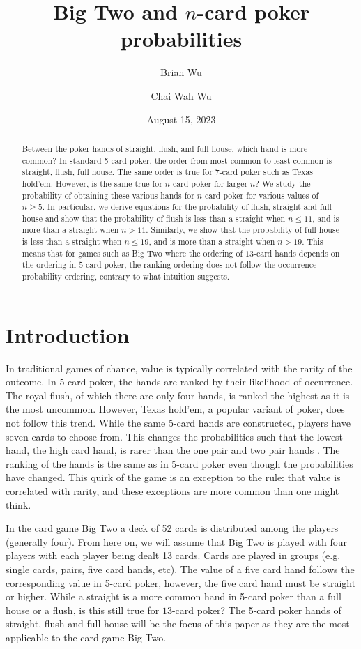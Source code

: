 \documentclass{article}
\title{Big Two and $n$-card poker probabilities}
\author[1]{Brian Wu}
\author[2]{Chai Wah Wu}
\affil[1]{New York University\thanks{briantehwu@gmail.com}}
\affil[2]{MIT-IBM Watson AI Lab, IBM T. J. Watson Research Center\thanks{cwwu@us.ibm.com}}
\date{August 15, 2023}
\begin{document}
\lstset{language=Python}

\maketitle

\begin{abstract}
    Between the poker hands of straight, flush, and full house, which hand is more common? In standard 5-card poker, the order from most common to least common is straight, flush, full house. The same order is true for 7-card poker such as Texas hold'em. However, is the same true for $n$-card poker for larger $n$? We study the probability of obtaining these various hands for $n$-card poker for various values of $n\geq 5$. In particular, we derive equations for the probability of flush, straight and full house and show that the probability of flush is less than a straight when $n \leq 11$, and is more than a straight when $n>11$.
    Similarly, we show that the probability of full house is less than a straight when $n \leq 19$, and is more than a straight when $n>19$.
    This means that for games such as Big Two where the ordering of $13$-card hands depends on the ordering in $5$-card poker, the ranking ordering does not follow the occurrence probability ordering, contrary to what intuition suggests.
\end{abstract}

\section{Introduction}
In traditional games of chance, value is typically correlated with the rarity of the outcome. In 5-card poker, the hands are ranked by their likelihood of occurrence. The royal flush, of which there are only four hands, is ranked the highest as it is the most uncommon. However, Texas hold'em, a popular variant of poker, does not follow this trend. While the same 5-card hands are constructed, players have seven cards to choose from. This changes the probabilities such that the lowest hand, the high card hand, is rarer than the one pair and two pair hands \cite{wiki:Poker_probability}. The ranking of the hands is the same as in 5-card poker even though the probabilities have changed. This quirk of the game is an exception to the rule: that value is correlated with rarity, and these exceptions are more common than one might think.

In the card game Big Two \cite{wiki:Big_two} a deck of 52 cards is distributed among the players (generally four). From here on, we will assume that Big Two is played with four players with each player being dealt 13 cards. Cards are played in groups (e.g. single cards, pairs, five card hands, etc). The value of a five card hand follows the corresponding value in 5-card poker, however, the five card hand must be straight or higher. While a straight is a more common hand in 5-card poker than a full house or a flush, is this still true for $13$-card poker? The 5-card poker hands of straight, flush and full house will be the focus of this paper as they are the most applicable to the card game Big Two.
\end{document}
